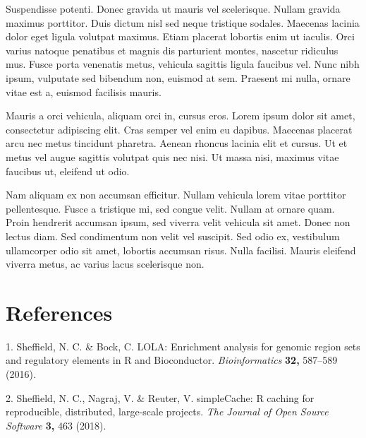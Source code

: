 \documentclass[10pt]{article}
\newlength{\cslhangindent}       %
\newenvironment{cslreferences}%
  {\everypar{\setlength{\hangindent}{\cslhangindent}}}%
  {\par} %
\begin{document}
Suspendisse potenti. Donec gravida ut mauris vel scelerisque. Nullam
gravida maximus porttitor. Duis dictum nisl sed neque tristique sodales.
Maecenas lacinia dolor eget ligula volutpat maximus. Etiam placerat
lobortis enim ut iaculis. Orci varius natoque penatibus et magnis dis
parturient montes, nascetur ridiculus mus. Fusce porta venenatis metus,
vehicula sagittis ligula faucibus vel. Nunc nibh ipsum, vulputate sed
bibendum non, euismod at sem. Praesent mi nulla, ornare vitae est a,
euismod facilisis mauris.

Mauris a orci vehicula, aliquam orci in, cursus eros. Lorem ipsum dolor
sit amet, consectetur adipiscing elit. Cras semper vel enim eu dapibus.
Maecenas placerat arcu nec metus tincidunt pharetra. Aenean rhoncus
lacinia elit et cursus. Ut et metus vel augue sagittis volutpat quis nec
nisi. Ut massa nisi, maximus vitae faucibus ut, eleifend ut odio.

Nam aliquam ex non accumsan efficitur. Nullam vehicula lorem vitae
porttitor pellentesque. Fusce a tristique mi, sed congue velit. Nullam
at ornare quam. Proin hendrerit accumsan ipsum, sed viverra velit
vehicula sit amet. Donec non lectus diam. Sed condimentum non velit vel
suscipit. Sed odio ex, vestibulum ullamcorper odio sit amet, lobortis
accumsan risus. Nulla facilisi. Mauris eleifend viverra metus, ac varius
lacus scelerisque non.

\hypertarget{references}{%
\section*{References}\label{references}}

\hypertarget{refs}{}
\begin{cslreferences}
\leavevmode\hypertarget{ref-Sheffield2016}{}%
1. Sheffield, N. C. \& Bock, C. LOLA: Enrichment analysis for genomic
region sets and regulatory elements in R and Bioconductor.
\emph{Bioinformatics} \textbf{32,} 587--589 (2016).

\leavevmode\hypertarget{ref-Sheffield2018}{}%
2. Sheffield, N. C., Nagraj, V. \& Reuter, V. simpleCache: R caching for
reproducible, distributed, large-scale projects. \emph{The Journal of
Open Source Software} \textbf{3,} 463 (2018).
\end{cslreferences}

\end{document}
